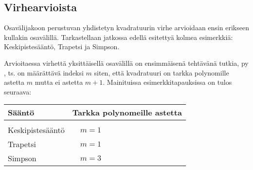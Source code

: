 \subsection{Virhearvioista}

Osavälijakoon perustuvan yhdistetyn kvadratuurin virhe arvioidaan ensin erikseen kullakin
osavälillä. Tarkastellaan jatkossa edellä esitettyä kolmea esimerkkiä: Keskipistesääntö, 
Trapetsi ja Simpson.

Arvioitaessa virhettä yksittäisellä osavälillä on ensimmäisenä tehtävänä tutkia,  
 py   
, ts. on määrättävä indeksi $m$ siten, että kvadratuuri on tarkka polynomille
astetta $m$ mutta ei astetta $m+1$. Mainituissa esimerkkitapauksissa on tulos seuraava:
\begin{center}
\begin{tabular}{ll}
Sääntö & \hspace{2mm} Tarkka polynomeille astetta \\ \hline \\
Keskipistesääntö & $\quad m=1$ \\ Trapetsi & $\quad m=1$ \\ Simpson & $\quad m=3$
\end{tabular}
\end{center}

